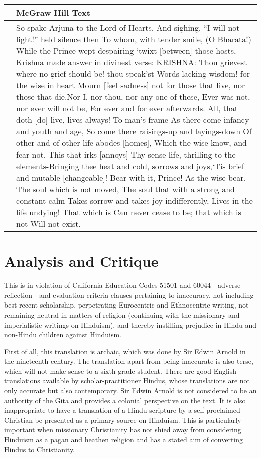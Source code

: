 \begin{longtable}{|>{\raggedleft}p{1.5cm}|p{8.5cm}|}
\multicolumn{2}{|c|{\textbf{Table: 4}} 
\hline
\multicolumn{1}{|l|}{\textbf{Page #}} & \multicolumn{1}{|l|}{\textbf{McGraw Hill Text}} \tabularnewline
\hline 
280 & So spake Arjuna to the Lord of Hearts. And sighing, “I will not fight!” held silence then To whom, with tender smile, (O Bharata!) While the Prince wept despairing ‘twixt [between] those hosts, Krishna made answer in divinest verse: KRISHNA: Thou grievest where no grief should be! thou speak’st Words lacking wisdom! for the wise in heart Mourn [feel sadness] not for those that live, nor those that die.Nor I, nor thou, nor any one of these, Ever was not, nor ever will not be, For ever and for ever afterwards. All, that doth [do] live, lives always! To man’s frame As there come infancy and youth and age, So come there raisings-up and layings-down Of other and of other life-abodes [homes], Which the wise know, and fear not. This that irks [annoys]-Thy sense-life, thrilling to the elements-Bringing thee heat and cold, sorrows and joys,‘Tis brief and mutable [changeable]! Bear with it, Prince! As the wise bear. The soul which is not moved, The soul that with a strong and constant calm Takes sorrow and takes joy indifferently, Lives in the life undying! That which is Can never cease to be; that which is not Will not exist. \tabularnewline
\hline
\end{longtable}

\section*{Analysis and Critique} 

This is in violation of California Education Codes 51501 and 60044—adverse reflection—and evaluation criteria clauses pertaining to inaccuracy, not including best recent scholarship, perpetrating Eurocentric and Ethnocentric writing, not remaining neutral in matters of religion (continuing with the missionary and imperialistic writings on Hinduism), and thereby instilling prejudice in Hindu and non-Hindu children against Hinduism.\textbf{} 

First of all, this translation is archaic, which was done by Sir Edwin Arnold in the nineteenth century. The translation apart from being inaccurate is also terse, which will not make sense to a sixth-grade student. There are good English translations available by scholar-practitioner Hindus, whose translations are not only accurate but also contemporary. Sir Edwin Arnold is not considered to be an authority of the Gita and provides a colonial perspective on the text. It is also inappropriate to have a translation of a Hindu scripture by a self-proclaimed Christian be presented as a primary source on Hinduism. This is particularly important when missionary Christianity has not shied away from considering Hinduism as a pagan and heathen religion and has a stated aim of converting Hindus to Christianity.


